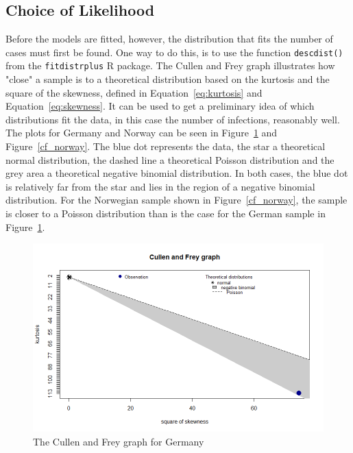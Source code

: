 \subsection{Choice of Likelihood}\label{sec:likelihood}
Before the models are fitted, however, the distribution that fits the number of cases must first be found. One way to do this, is to use the function \texttt{descdist()} from the \texttt{fitdistrplus} R package. The Cullen and Frey graph illustrates how "close" a sample is to a theoretical distribution based on the kurtosis and the square of the skewness, defined in Equation~\ref{eq:kurtosis} and Equation~\ref{eq:skewness}. It can be used to get a preliminary idea of which distributions fit the data, in this case the number of infections, reasonably well. \\
The plots for Germany and Norway can be seen in Figure~\ref{cf_germany} and Figure~\ref{cf_norway}. The blue dot represents the data, the star a theoretical normal distribution, the dashed line a theoretical Poisson distribution and the grey area a theoretical negative binomial distribution. In both cases, the blue dot is relatively far from the star and lies in the region of a negative binomial distribution. For the Norwegian sample shown in Figure~\ref{cf_norway}, the sample is closer to a Poisson distribution than is the case for the German sample in Figure~\ref{cf_germany}.
\begin{figure}[H]
  \centering
  \includegraphics[width = \textwidth]{cf_germany.png}
  \caption{The Cullen and Frey graph for Germany}
  \label{cf_germany}
\end{figure}
